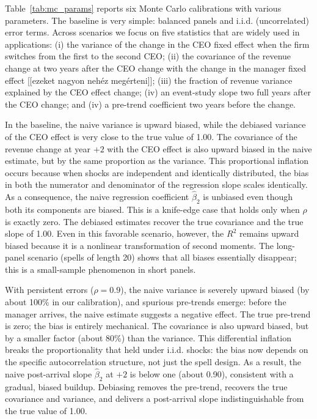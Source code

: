 \documentclass[11pt,a4paper]{article}
\begin{document}
Table~\ref{tab:mc_params} reports six Monte Carlo calibrations with various parameters. The baseline is very simple: balanced panels and i.i.d. (uncorrelated) error terms. Across scenarios we focus on five statistics that are widely used in applications: (i) the variance of the change in the CEO fixed effect when the firm switches from the first to the second CEO; (ii) the covariance of the revenue change at two years after the CEO change with the change in the manager fixed effect [[ezeket nagyon nehéz megérteni]]; (iii) the fraction of revenue variance explained by the CEO effect change; (iv) an event-study slope two full years after the CEO change; and (iv) a pre-trend coefficient two years before the change.

In the baseline, the naive variance is upward biased, while the debiased variance of the CEO effect is very close to the true value of 1.00. The covariance of the revenue change at year $+2$ with the CEO effect is also upward biased in the naive estimate, but by the same proportion as the variance. This proportional inflation occurs because when shocks are independent and identically distributed, the bias in both the numerator and denominator of the regression slope scales identically. As a consequence, the naive regression coefficient $\hat\beta_2$ is unbiased even though both its components are biased. This is a knife-edge case that holds only when $\rho$ is exactly zero. The debiased estimates recover the true covariance and the true slope of 1.00. Even in this favorable scenario, however, the $R^2$ remains upward biased because it is a nonlinear transformation of second moments. The long-panel scenario (spells of length 20) shows that all biases essentially disappear; this is a small-sample phenomenon in short panels.

With persistent errors ($\rho=0.9$), the naive variance is severely upward biased (by about 100\% in our calibration), and spurious pre-trends emerge: before the manager arrives, the naive estimate suggests a negative effect. The true pre-trend is zero; the bias is entirely mechanical. The covariance is also upward biased, but by a smaller factor (about 80\%) than the variance. This differential inflation breaks the proportionality that held under i.i.d. shocks: the bias now depends on the specific autocorrelation structure, not just the spell design. As a result, the naive post-arrival slope $\hat\beta_2$ at $+2$ is below one (about 0.90), consistent with a gradual, biased buildup. Debiasing removes the pre-trend, recovers the true covariance and variance, and delivers a post-arrival slope indistinguishable from the true value of 1.00.
\end{document}
